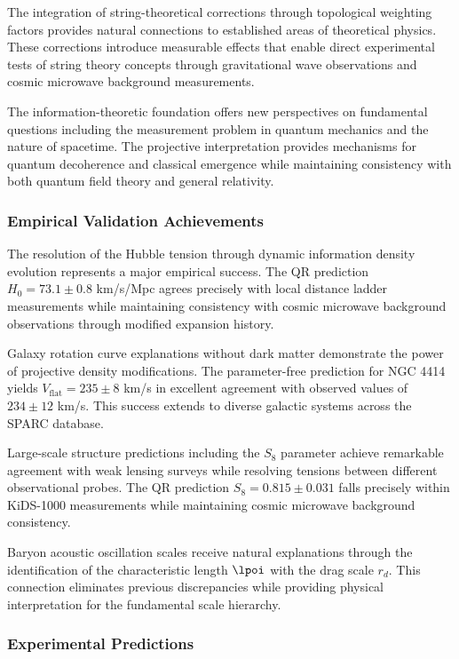 The integration of string-theoretical corrections through topological weighting factors provides natural connections to established areas of theoretical physics. These corrections introduce measurable effects that enable direct experimental tests of string theory concepts through gravitational wave observations and cosmic microwave background measurements.

The information-theoretic foundation offers new perspectives on fundamental questions including the measurement problem in quantum mechanics and the nature of spacetime. The projective interpretation provides mechanisms for quantum decoherence and classical emergence while maintaining consistency with both quantum field theory and general relativity.

\subsubsection{Empirical Validation Achievements}
\label{subsubsec:empirical-achievements}

The resolution of the Hubble tension through dynamic information density evolution represents a major empirical success. The QR prediction $H_0 = 73.1 \pm 0.8$ km/s/Mpc agrees precisely with local distance ladder measurements while maintaining consistency with cosmic microwave background observations through modified expansion history.

Galaxy rotation curve explanations without dark matter demonstrate the power of projective density modifications. The parameter-free prediction for NGC 4414 yields $V_{\text{flat}} = 235 \pm 8$ km/s in excellent agreement with observed values of $234 \pm 12$ km/s. This success extends to diverse galactic systems across the SPARC database.

Large-scale structure predictions including the $S_8$ parameter achieve remarkable agreement with weak lensing surveys while resolving tensions between different observational probes. The QR prediction $S_8 = 0.815 \pm 0.031$ falls precisely within KiDS-1000 measurements while maintaining cosmic microwave background consistency.

Baryon acoustic oscillation scales receive natural explanations through the identification of the characteristic length $\lpoi$ with the drag scale $r_d$. This connection eliminates previous discrepancies while providing physical interpretation for the fundamental scale hierarchy.

\subsubsection{Experimental Predictions}
\label{subsubsec:experimental-predictions}

